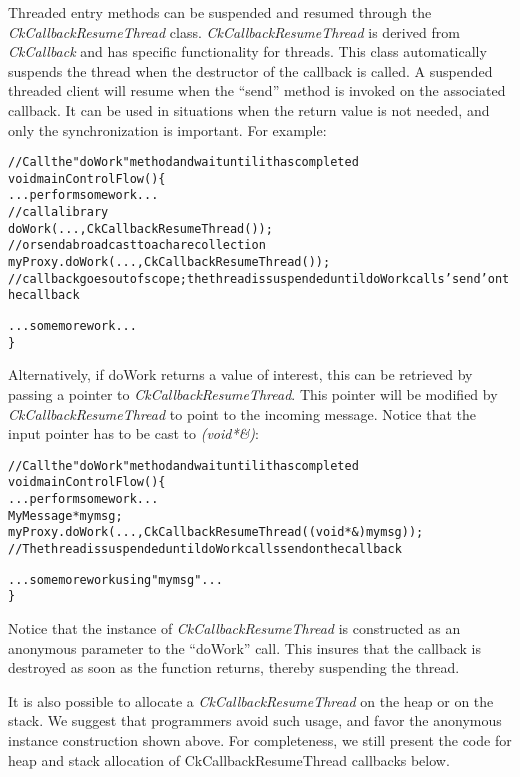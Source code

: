 \label{sec:ckcallbackresumethread}

Threaded entry methods can be suspended and resumed through the {\em
  CkCallbackResumeThread} class. {\em CkCallbackResumeThread} is
derived from {\em CkCallback} and has specific functionality for
threads.  This class automatically suspends the thread when the
destructor of the callback is called.  A suspended threaded client
will resume when the ``send'' method is invoked on the associated
callback.  It can be used in situations when the return value is not
needed, and only the synchronization is important. For example:

\begin{alltt}
// Call the "doWork" method and wait until it has completed
void mainControlFlow() \{
  ...perform some work...
  // call a library
  doWork(...,CkCallbackResumeThread());
  // or send a broadcast to a chare collection
  myProxy.doWork(...,CkCallbackResumeThread());
  // callback goes out of scope; the thread is suspended until doWork calls 'send' on the callback
  
  ...some more work...
\}
\end{alltt}

Alternatively, if doWork returns a value of interest, this can be retrieved by
passing a pointer to {\em CkCallbackResumeThread}. This pointer will be modified
by {\em CkCallbackResumeThread} to point to the incoming message. Notice that
the input pointer has to be cast to {\em (void*\&)}:

\begin{alltt}
// Call the "doWork" method and wait until it has completed
void mainControlFlow() \{
  ...perform some work...
  MyMessage *mymsg;
  myProxy.doWork(...,CkCallbackResumeThread((void*\&)mymsg));
  // The thread is suspended until doWork calls send on the callback

  ...some more work using "mymsg"...
\}
\end{alltt}

Notice that the instance of {\em CkCallbackResumeThread} is constructed
as an anonymous parameter to the ``doWork'' call. This insures that the callback
is destroyed as soon as the function returns, thereby suspending the thread.

It is also possible to allocate a {\em CkCallbackResumeThread} on the heap or on
the stack. We suggest that programmers avoid such usage, and favor the anonymous instance construction
shown above. For completeness, we still present the code for heap and stack
allocation of CkCallbackResumeThread callbacks below.

